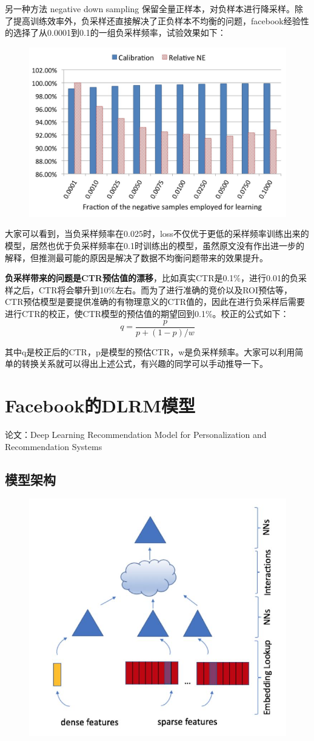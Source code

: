 \documentclass[12pt]{article}
\begin{document}
另一种方法 negative down sampling 保留全量正样本，对负样本进行降采样。除了提高训练效率外，负采样还直接解决了正负样本不均衡的问题，facebook经验性的选择了从0.0001到0.1的一组负采样频率，试验效果如下：
\begin{figure}[H]
    \centering
    \includegraphics[width=.6\textwidth]{fig/Facebook_Negative_Down_Sampling.jpg}
\end{figure}
大家可以看到，当负采样频率在0.025时，loss不仅优于更低的采样频率训练出来的模型，居然也优于负采样频率在0.1时训练出的模型，虽然原文没有作出进一步的解释，但推测最可能的原因是解决了数据不均衡问题带来的效果提升。

\textbf{负采样带来的问题是CTR预估值的漂移}，比如真实CTR是0.1\%，进行0.01的负采样之后，CTR将会攀升到10\%左右。而为了进行准确的竞价以及ROI预估等，CTR预估模型是要提供准确的有物理意义的CTR值的，因此在进行负采样后需要进行CTR的校正，使CTR模型的预估值的期望回到0.1\%。校正的公式如下：
$$
q = \frac{p}{p + (1-p)/w}
$$

其中q是校正后的CTR，p是模型的预估CTR，w是负采样频率。大家可以利用简单的转换关系就可以得出上述公式，有兴趣的同学可以手动推导一下。

\section{Facebook的DLRM模型}
论文：Deep Learning Recommendation Model for Personalization and Recommendation Systems

\subsection{模型架构}
\begin{figure}[H]
    \centering
    \includegraphics[width=.6\textwidth]{fig/Facebook_DLRM_Structure.jpg}
\end{figure}
\end{document}
